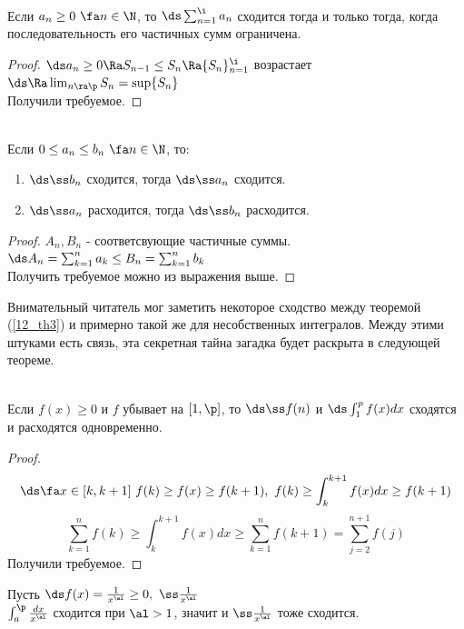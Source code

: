 \begin{theorem}\label{12_th2}\\
	Если $a_n\ge0\ \fa n\in\N$, то $\ds\sum_{n=1}^\i a_n$ сходится тогда и только тогда, когда последовательность его частичных сумм ограничена.
\end{theorem}
\begin{proof}
	$\ds a_n\ge0\Ra S_{n-1}\le S_n\Ra\{S_n\}_{n=1}^\i$ возрастает $\ds\Ra\lim_{n\ra\p}S_n=\sup\{S_n\}$\\
	Получили требуемое.
\end{proof}
\begin{theorem}\label{12_th3}\\
	Если $0\le a_n\le b_n\ \fa n\in\N$, то:
	\begin{enumerate}
		\item $\ds\ss b_n$ сходится, тогда $\ds\ss a_n$ сходится.
		\item $\ds\ss a_n$ расходится, тогда $\ds\ss b_n$ расходится.
	\end{enumerate}
\end{theorem}
\begin{proof}
	$A_n,B_n$ - соответсвующие частичные суммы.\\
	$\ds A_n=\sum_{k=1}^n a_k\le B_n=\sum_{k=1}^n b_k$\\
	Получить требуемое можно из выражения выше.
\end{proof}
\begin{note}
	Внимательный читатель мог заметить некоторое сходство между теоремой (\ref{12_th3}) и примерно такой же для несобственных интегралов. Между этими штуками есть связь, эта секретная тайна загадка будет раскрыта в следующей теореме.
\end{note}
\begin{theorem}\label{12_th4}\\
	Если $f(x)\ge0$ и $f$ убывает на $[1,\p]$, то $\ds\ss f(n)$ и $\ds\int_1^pf(x)dx$ сходятся и расходятся одновременно.
\end{theorem}
\begin{proof}
	\[\ds\fa x\in[k,k+1]\ f(k)\ge f(x)\ge f(k+1),\ f(k)\ge\int_k^{k+1}f(x)dx\ge f(k+1)\]
	\[\sum_{k=1}^nf(k)\ge\int_k^{k   +1}f(x)dx\ge\sum_{k=1}^nf(k+1)=\sum_{j=2}^{n+1}f(j)\]
	Получили требуемое.
\end{proof}
\begin{example}
	Пусть $\ds f(x)=\frac1{x^\al}\ge0,\ \ss\frac1{x^\al}$\\
	$\int_a^\p\frac{dx}{x^\al}$ сходится при $\al>1$, значит и $\ss\frac1{x^\al}$ тоже сходится.
\end{example}
